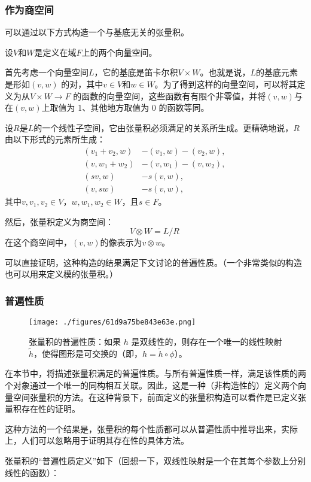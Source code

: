 \subsubsection{作为商空间}
可以通过以下方式构造一个与基底无关的张量积。

设\( V \)和\( W \)是定义在域\( F \)上的两个向量空间。

首先考虑一个向量空间\( L \)，它的基底是笛卡尔积\( V \times W \)。也就是说，\( L \)的基底元素是形如\( (v, w) \) 的对，其中\( v \in V \)和\( w \in W \)。为了得到这样的向量空间，可以将其定义为从\( V \times W \to F \) 的函数的向量空间，这些函数有有限个非零值，并将\( (v, w) \)与在\( (v, w) \)上取值为 1、其他地方取值为 0 的函数等同。

设\( R \)是\( L \)的一个线性子空间，它由张量积必须满足的关系所生成。更精确地说，\( R \)由以下形式的元素所生成：
\[
\begin{aligned}
(v_1 + v_2, w) &- (v_1, w) - (v_2, w), \\
(v, w_1 + w_2) &- (v, w_1) - (v, w_2), \\
(sv, w) &- s(v, w), \\
(v, sw) &- s(v, w),
\end{aligned}~
\]
其中\( v, v_1, v_2 \in V \)，\( w, w_1, w_2 \in W \)，且\( s \in F \)。

然后，张量积定义为商空间：
\[
V \otimes W = L / R~
\]
在这个商空间中，\( (v, w) \)的像表示为\( v \otimes w \)。

可以直接证明，这种构造的结果满足下文讨论的普遍性质。（一个非常类似的构造也可以用来定义模的张量积。）
\subsubsection{普遍性质}
\begin{figure}[ht]
\centering
\texttt{[image: ./figures/61d9a75be843e63e.png]}
\caption{张量积的普遍性质：如果 \( h \) 是双线性的，则存在一个唯一的线性映射 \( \tilde{h} \)，使得图形是可交换的（即，\( h = \tilde{h} \circ \phi \)）。} \label{fig_ZLJ_1}
\end{figure}
在本节中，将描述张量积满足的普遍性质。与所有普遍性质一样，满足该性质的两个对象通过一个唯一的同构相互关联。因此，这是一种（非构造性的）定义两个向量空间张量积的方法。在这种背景下，前面定义的张量积构造可以看作是已定义张量积存在性的证明。

这种方法的一个结果是，张量积的每个性质都可以从普遍性质中推导出来，实际上，人们可以忽略用于证明其存在性的具体方法。

张量积的“普遍性质定义”如下（回想一下，双线性映射是一个在其每个参数上分别线性的函数）：

